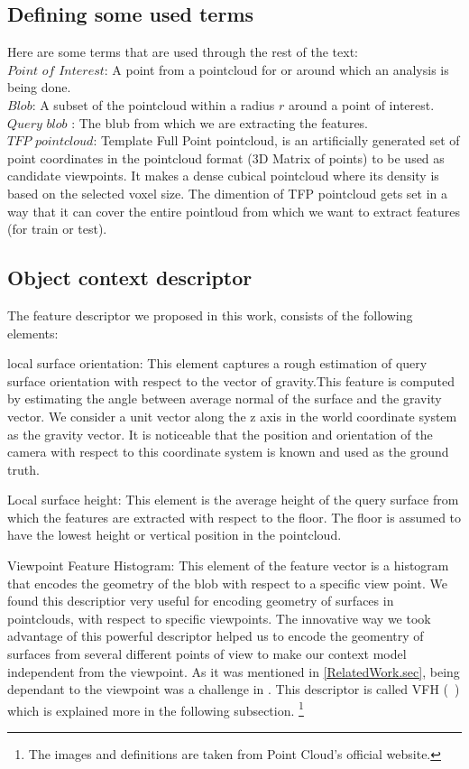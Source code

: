 \subsection{Defining some used terms}

Here are some terms that are used through the rest of the text:\\
$Point$ $of$ $Interest$: A point from a pointcloud for or around which an analysis is being done.\\
$Blob$: A subset of the pointcloud within a radius $r$ around a point of interest.\\
$Query$ $blob$ : The blub from which we are extracting the features.\\
$TFP$ $pointcloud$: Template Full Point pointcloud, is an artificially generated set of point coordinates in the pointcloud format (3D Matrix of points) to be used as candidate viewpoints. It makes a dense cubical pointcloud where its density is based on the selected voxel size. The dimention of TFP pointcloud gets set in a way that it can cover the entire pointloud from which we want to extract features (for train or test).\\



\subsection{Object context descriptor}
\label{OCD.ssec}
 
The feature descriptor we proposed in this work, consists of the following elements:

local surface orientation:
This element captures a rough estimation of query surface orientation with respect to the vector of gravity.This feature is computed by estimating the angle between average normal of the surface and the gravity vector. We consider a unit vector along the z axis in the world coordinate system as the gravity vector. It is noticeable that the position and orientation of the camera with respect to this coordinate system is known and used as
the ground truth.


Local surface height:
This element is the average height of the query surface from which the features are extracted with respect to the floor. The floor is assumed to have the lowest height or vertical position in the pointcloud.
 

Viewpoint Feature Histogram:
This element of the feature vector is a histogram that encodes the geometry of the blob with respect to a specific view point. We found this descriptior very useful for encoding geometry of surfaces in pointclouds, with respect to specific viewpoints. The innovative way we took advantage of this powerful descriptor helped us to encode the geomentry of surfaces from several different points of view to make our context model independent from the viewpoint. As it was mentioned in \ref{RelatedWork.sec}, being dependant to the viewpoint was a challenge in \cite{aydemir2012_3Dcontext}.
This descriptor is called VFH (~\cite{5651280}) which is explained more in the following subsection. \footnote{The images and definitions are taken from Point Cloud's official website.}

